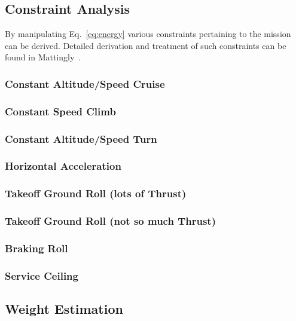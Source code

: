 \documentclass[pdftex,11pt,letter]{article}
\begin{document}
\subsection{Constraint Analysis}
By manipulating Eq.~\ref{eq:energy} various constraints pertaining to the mission can be derived. Detailed derivation and treatment of such constraints can be found in Mattingly~\etal\cite{MattinglyText}.

\subsubsection{Constant Altitude/Speed Cruise}

\subsubsection{Constant Speed Climb}

\subsubsection{Constant Altitude/Speed Turn}

\subsubsection{Horizontal Acceleration}

\subsubsection{Takeoff Ground Roll (lots of Thrust)}

\subsubsection{Takeoff Ground Roll (not so much Thrust)}

\subsubsection{Braking Roll}

\subsubsection{Service Ceiling}

\subsection{Weight Estimation}
\end{document}
